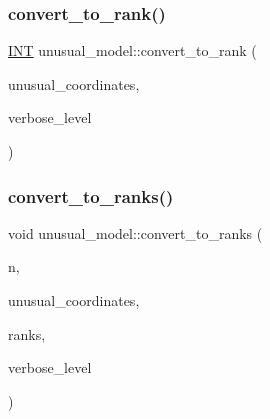 \mbox{\label{classunusual__model_ac3c9a8673189d7f889ff019f1c2a9bf7}} 
\subsubsection{\texorpdfstring{convert\+\_\+to\+\_\+rank()}{convert\_to\_rank()}}
{\footnotesize\ttfamily \mbox{\hyperlink{galois_8h_a09fddde158a3a20bd2dcadb609de11dc}{I\+NT}} unusual\+\_\+model\+::convert\+\_\+to\+\_\+rank (\begin{DoxyParamCaption}\item[{\mbox{\hyperlink{galois_8h_a09fddde158a3a20bd2dcadb609de11dc}{I\+NT}} $\ast$}]{unusual\+\_\+coordinates,  }\item[{\mbox{\hyperlink{galois_8h_a09fddde158a3a20bd2dcadb609de11dc}{I\+NT}}}]{verbose\+\_\+level }\end{DoxyParamCaption})}

\mbox{\label{classunusual__model_ab5cdb8ec08ae842b6ae4831385e9934b}} 
\subsubsection{\texorpdfstring{convert\+\_\+to\+\_\+ranks()}{convert\_to\_ranks()}}
{\footnotesize\ttfamily void unusual\+\_\+model\+::convert\+\_\+to\+\_\+ranks (\begin{DoxyParamCaption}\item[{\mbox{\hyperlink{galois_8h_a09fddde158a3a20bd2dcadb609de11dc}{I\+NT}}}]{n,  }\item[{\mbox{\hyperlink{galois_8h_a09fddde158a3a20bd2dcadb609de11dc}{I\+NT}} $\ast$}]{unusual\+\_\+coordinates,  }\item[{\mbox{\hyperlink{galois_8h_a09fddde158a3a20bd2dcadb609de11dc}{I\+NT}} $\ast$}]{ranks,  }\item[{\mbox{\hyperlink{galois_8h_a09fddde158a3a20bd2dcadb609de11dc}{I\+NT}}}]{verbose\+\_\+level }\end{DoxyParamCaption})}

\mbox{\label{classunusual__model_a80bd3b8fc5c7332b9629e17ac3ad2c76}} 
